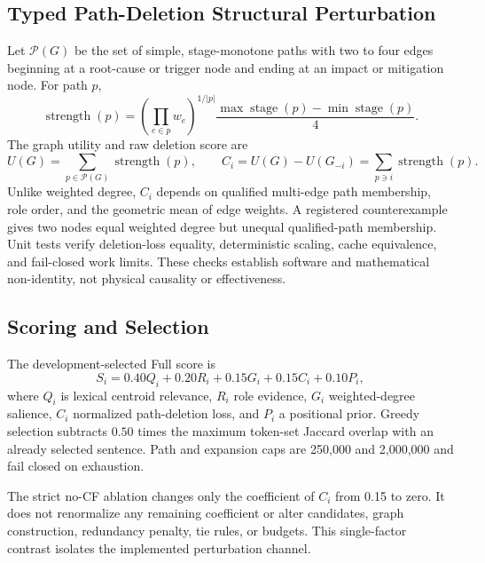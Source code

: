 \documentclass[applsci,article,submit,moreauthors]{Definitions/mdpi}
\begin{document}
\subsection{Typed Path-Deletion Structural Perturbation}

Let $\mathcal{P}(G)$ be the set of simple, stage-monotone paths with two to four edges beginning at a root-cause or trigger node and ending at an impact or mitigation node. For path $p$,
\begin{equation}
\operatorname{strength}(p)=\left(\prod_{e\in p}w_e\right)^{1/|p|}\frac{\max\operatorname{stage}(p)-\min\operatorname{stage}(p)}{4}.
\end{equation}
The graph utility and raw deletion score are
\begin{equation}
U(G)=\sum_{p\in\mathcal{P}(G)}\operatorname{strength}(p),\qquad
C_i=U(G)-U(G_{-i})=\sum_{p\ni i}\operatorname{strength}(p).
\end{equation}
Unlike weighted degree, $C_i$ depends on qualified multi-edge path membership, role order, and the geometric mean of edge weights. A registered counterexample gives two nodes equal weighted degree but unequal qualified-path membership. Unit tests verify deletion-loss equality, deterministic scaling, cache equivalence, and fail-closed work limits. These checks establish software and mathematical non-identity, not physical causality or effectiveness.

\subsection{Scoring and Selection}

The development-selected Full score is
\begin{equation}
S_i=0.40Q_i+0.20R_i+0.15G_i+0.15C_i+0.10P_i,
\end{equation}
where $Q_i$ is lexical centroid relevance, $R_i$ role evidence, $G_i$ weighted-degree salience, $C_i$ normalized path-deletion loss, and $P_i$ a positional prior. Greedy selection subtracts $0.50$ times the maximum token-set Jaccard overlap with an already selected sentence. Path and expansion caps are 250,000 and 2,000,000 and fail closed on exhaustion.

The strict no-CF ablation changes only the coefficient of $C_i$ from 0.15 to zero. It does not renormalize any remaining coefficient or alter candidates, graph construction, redundancy penalty, tie rules, or budgets. This single-factor contrast isolates the implemented perturbation channel.
\end{document}
